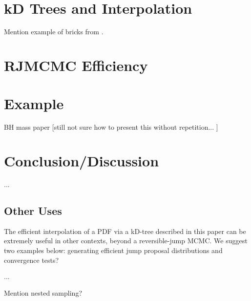 \documentclass[prd,preprint]{revtex4}
\begin{document}
\section{kD Trees and Interpolation}

Mention example of bricks from \cite{Littenberg2009}.

\section{RJMCMC Efficiency}

\section{Example}

BH mass paper [still not sure how to present this without repetition...  ]  




\section{Conclusion/Discussion}

...

\subsection{Other Uses}
The efficient interpolation of a PDF via a kD-tree described in this paper can be extremely useful in other contexts, beyond a reversible-jump MCMC.  We suggest two examples below: generating efficient jump proposal distributions and convergence tests?

...

Mention nested sampling?

\nocite{Littenberg2009}


\end{document}
